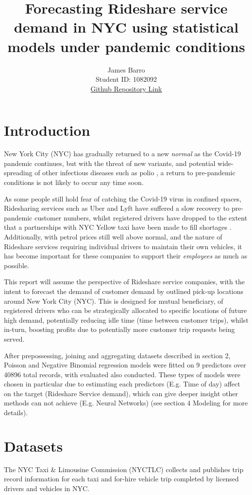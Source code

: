 \documentclass[11pt]{article}
\title{\textbf{Forecasting Rideshare service demand in NYC using statistical models under pandemic conditions} \\}
\author{
James Barro \\
Student ID: 1082092 \\
\href{https://github.com/MAST30034-Applied-Data-Science/mast30034-project-1-JamesB112}{Github Repository Link}
}
\begin{document}
\maketitle

\section{Introduction}

New York City (NYC) has gradually returned to a new \textit{normal} as the Covid-19 pandemic continues, but with the threat of new variants, and potential wide-spreading of other infectious diseases such as polio \cite{infectious}, a return to pre-pandemic conditions is not likely to occur any time soon. 

As some people still hold fear of catching the Covid-19 virus in confined spaces, Ridesharing services such as Uber and Lyft have suffered a slow recovery to pre-pandemic customer numbers, whilst registered drivers have dropped to the extent that a partnerships with NYC Yellow taxi have been made to fill shortages \cite{uber_article}. Additionally, with petrol prices still well above normal, and the nature of Rideshare services requiring individual drivers to maintain their own vehicles, it has become important for these companies to support their \textit{employees} as much as possible.

This report will assume the perspective of Rideshare service companies, with the intent to forecast the demand of customer demand by outlined pick-up locations around New York City (NYC). This is designed for mutual beneficiary, of registered drivers who can be strategically allocated to specific locations of future high demand, potentially reducing idle time (time between customer trips), whilst in-turn, boosting profits due to potentially more customer trip requests being served.

After prepossessing, joining and aggregating datasets described in section 2, Poisson and Negative Binomial regression models were fitted on 9 predictors over 40896 total records, with evaluated also conducted. These types of models were chosen in particular due to estimating each predictors (E.g. Time of day) affect on the target (Rideshare Service demand), which can give deeper insight other methods can not achieve (E.g. Neural Networks) (see section 4 Modeling for more details).

\section{Datasets}
The NYC Taxi \& Limousine Commission (NYCTLC) \cite{tlc} collects and publishes trip record information for each taxi and for-hire vehicle trip completed by licensed drivers and vehicles in NYC.
\end{document}
